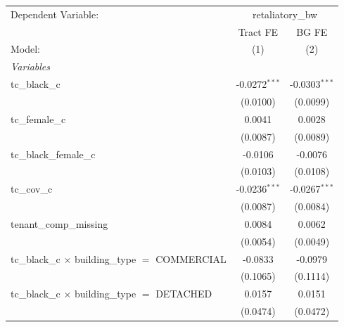 \par\endgroup
\begingroup
\centering
\begin{tabular}{lcc}
   \tabularnewline \midrule \midrule
   Dependent Variable: & \multicolumn{2}{c}{retaliatory\_bw}\\
                                                                       & Tract FE        & BG FE \\   
   Model:                                                              & (1)             & (2)\\  
   \midrule
   \emph{Variables}\\
   tc\_black\_c                                                        & -0.0272$^{***}$ & -0.0303$^{***}$\\   
                                                                       & (0.0100)        & (0.0099)\\   
   tc\_female\_c                                                       & 0.0041          & 0.0028\\   
                                                                       & (0.0087)        & (0.0089)\\   
   tc\_black\_female\_c                                                & -0.0106         & -0.0076\\   
                                                                       & (0.0103)        & (0.0108)\\   
   tc\_cov\_c                                                          & -0.0236$^{***}$ & -0.0267$^{***}$\\   
                                                                       & (0.0087)        & (0.0084)\\   
   tenant\_comp\_missing                                               & 0.0084          & 0.0062\\   
                                                                       & (0.0054)        & (0.0049)\\   
   tc\_black\_c $\times$ building\_type $=$ COMMERCIAL                 & -0.0833         & -0.0979\\   
                                                                       & (0.1065)        & (0.1114)\\   
   tc\_black\_c $\times$ building\_type $=$ DETACHED                   & 0.0157          & 0.0151\\   
                                                                       & (0.0474)        & (0.0472)\\   

\end{tabular}
